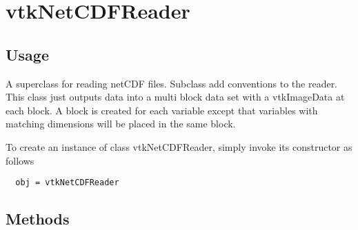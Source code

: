 \section{vtkNetCDFReader}

\subsection{Usage}


 A superclass for reading netCDF files.  Subclass add conventions to the
 reader.  This class just outputs data into a multi block data set with a
 vtkImageData at each block.  A block is created for each variable except that
 variables with matching dimensions will be placed in the same block.

To create an instance of class vtkNetCDFReader, simply
invoke its constructor as follows
\begin{verbatim}
  obj = vtkNetCDFReader
\end{verbatim}
\subsection{Methods}

